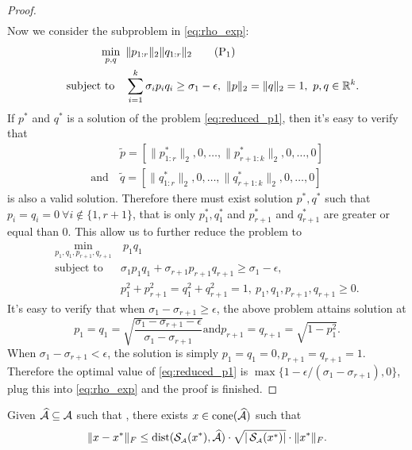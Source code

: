 \begin{proof}
\begin{align}
  \end{align}
  Now we consider the subproblem in \eqref{eq:rho_exp}: 
  \begin{align}
    \min_{p,q}\enspace & \| p_{1:r} \|_2 \| q_{1:r} \|_2 \label{eq:reduced_p1} \tag{P$_1$} \\
    \hbox{\quad subject to\quad} & \sum_{i=1}^{k} \sigma_i p_i q_i \geq \sigma_1 - \epsilon,~ \|p\|_2 = \|q\|_2 = 1, ~p,q \in \mathbb{R}^{ k }. \nonumber
  \end{align}
  If $p^*$ and $q^*$ is a solution of the problem \eqref{eq:reduced_p1}, then it's easy to verify that 
  \begin{align*}
    & \tilde{p} = \left[ \| p^*_{1:r} \|_2, 0,\ldots, \|p^*_{r+1:k}\|_2, 0, \ldots, 0 \right] \\ 
    \text{and} ~& \tilde{q} = \left[ \| q^*_{1:r} \|_2, 0,\ldots, \|q^*_{r+1:k}\|_2, 0, \ldots, 0 \right]
  \end{align*}
  is also a valid solution. Therefore there must exist solution $p^*, q^*$ such that $p_i = q_i = 0~\forall i \notin \{1, r+1\}$, that is only $p^*_1, q^*_1$ and $p^*_{r+1}$ and $q^*_{r+1}$ are greater or equal than 0. This allow us to further reduce the problem to
  \begin{align*}
    \min_{ p_1, q_1, p_{r+1}, q_{r+1} } &~  p_1 q_1 \\
    \text{subject to} & \sigma_1 p_1 q_1 + \sigma_{r+1} p_{r+1} q_{r+1} \geq \sigma_1 - \epsilon, \\
    & p_1^2 + p_{r+1}^2 = q_1^2 + q_{r+1}^2 = 1, ~p_1, q_1, p_{r+1}, q_{r+1} \geq 0. 
  \end{align*}
  It's easy to verify that when $\sigma_1 - \sigma_{r+1} \geq \epsilon$, the above problem attains solution at 
  \[
    p_1 = q_1 = \sqrt{\frac{\sigma_1 - \sigma_{r+1} - \epsilon}{ \sigma_1 - \sigma_{r+1} } } \text{and} p_{r+1} = q_{r+1} = \sqrt{1 - p_1^2}.
  \]
  When $\sigma_1 - \sigma_{r+1} < \epsilon$, the solution is simply $p_1 = q_1 = 0, p_{r+1}= q_{r+1} = 1$.
  Therefore the optimal value of \eqref{eq:reduced_p1} is $\max\{1 - \epsilon / ( \sigma_1 - \sigma_{r+1} ), 0\}$, plug this into \autoref{eq:rho_exp} and the proof is finished. 
\end{proof}

\begin{proposition} \label{prop:dist_to_sol}
    Given $\widehat{\mathcal{A}} \subseteq \mathcal{A}$ such that , there exists $ x \in \operatorname{cone} ( \widehat{\mathcal{A}} ) $ such that 
    \begin{equation}
            \| x - x^* \|_F \leq \operatorname{dist}( \operatorname{\mathcal{S}_{\scriptscriptstyle\mathcal{A}}}(x^*), \widehat{\mathcal{A}} )\cdot \sqrt{| \operatorname{\mathcal{S}_{\scriptscriptstyle\mathcal{A}}}(x^*) |} \cdot \| x^* \|_F.  \label{eq:dist_to_sol}
    \end{equation}
\end{proposition}

